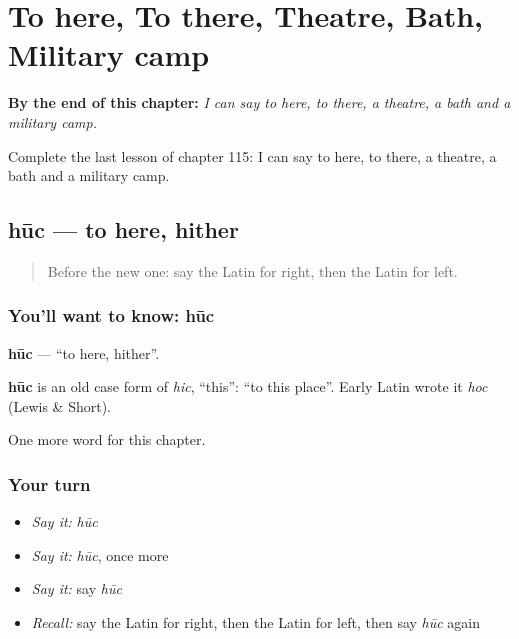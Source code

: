 
\chapter{To here, To there, Theatre, Bath, Military camp}
\label{ch:la-to-here-to-there-theatre-bath-military-camp}

\begin{chapteropening}
\textbf{By the end of this chapter:} \emph{I can say to here, to there, a theatre, a bath and a military camp.}

Complete the last lesson of chapter 115: I can say to here, to there, a theatre, a bath and a military camp.
\end{chapteropening}

\section[hūc]{hūc — to here, hither}

\label{lesson:LA-C115-huc}



\begin{quote}
Before the new one: say the Latin for right, then the Latin for left.
\end{quote}

\subsection*{You'll want to know: hūc}
\textbf{hūc} — \textquotedblleft{}to here, hither\textquotedblright{}.

\begin{cousinweb}
\textbf{hūc} is an old case form of \emph{hic}, \textquotedblleft{}this\textquotedblright{}: \textquotedblleft{}to this place\textquotedblright{}. Early Latin wrote it \emph{hoc} (Lewis \& Short).
\end{cousinweb}

\begin{grammarlens}[title={What you've built}]
One more word for this chapter.
\end{grammarlens}

\subsection*{Your turn}
\begin{itemize}
\raggedright
  \item \emph{Say it:} \emph{hūc}
  \item \emph{Say it:} \emph{hūc}, once more
  \item \emph{Say it:} say \emph{hūc}
  \item \emph{Recall:} say the Latin for right, then the Latin for left, then say \emph{hūc} again
\end{itemize}

